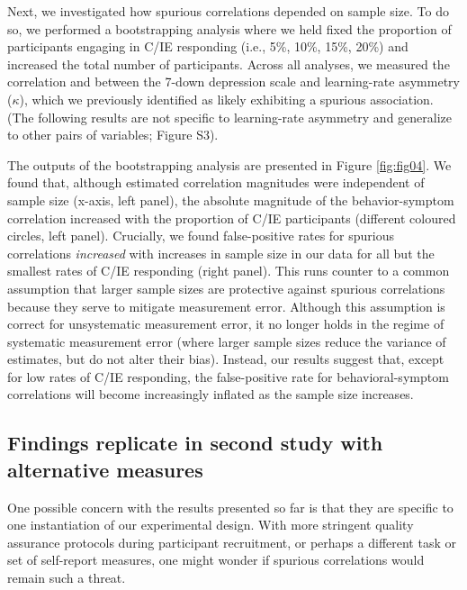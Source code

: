 \documentclass[a4paper,notitlepage,12pt]{article}
\begin{document}
Next, we investigated how spurious correlations depended on sample size. To do so, we performed a bootstrapping analysis where we held fixed the proportion of participants engaging in C/IE responding (i.e., 5\%, 10\%, 15\%, 20\%) and increased the total number of participants. Across all analyses, we measured the correlation and between the 7-down depression scale and learning-rate asymmetry ($\kappa$), which we previously identified as likely exhibiting a spurious association. (The following results are not specific to learning-rate asymmetry and generalize to other pairs of variables; Figure S3).  

The outputs of the bootstrapping analysis are presented in Figure \ref{fig:fig04}. We found that, although estimated correlation magnitudes were independent of sample size (x-axis, left panel), the absolute magnitude of the behavior-symptom correlation increased with the proportion of C/IE participants (different coloured circles, left panel). Crucially, we found false-positive rates for spurious correlations \emph{increased} with increases in sample size in our data for all but the smallest rates of C/IE responding (right panel). This runs counter to a common assumption that larger sample sizes are protective against spurious correlations because they serve to mitigate measurement error. Although this assumption is correct for unsystematic measurement error, it no longer holds in the regime of systematic measurement error (where larger sample sizes reduce the variance of estimates, but do not alter their bias). Instead, our results suggest that, except for low rates of C/IE responding, the false-positive rate for behavioral-symptom correlations will become increasingly inflated as the sample size increases.

\subsection*{Findings replicate in second study with alternative measures}

One possible concern with the results presented so far is that they are specific to one instantiation of our experimental design. With more stringent quality assurance protocols during participant recruitment, or perhaps a different task or set of self-report measures, one might wonder if spurious correlations would remain such a threat.
\end{document}
